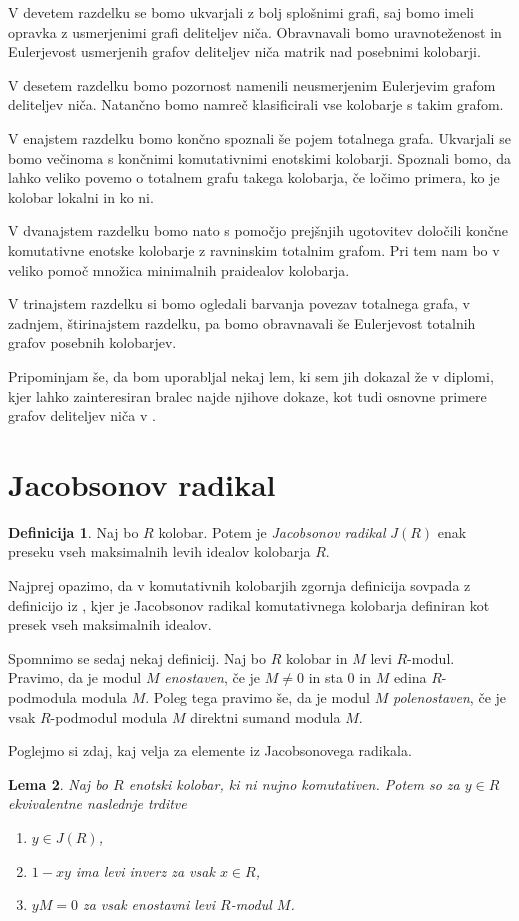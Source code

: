 \documentclass[a4paper, 12pt]{amsart}
\theoremstyle{definition} %
\newtheorem{definicija}{Definicija}[section]
\theoremstyle{plain} %
\newtheorem{lema}[definicija]{Lema}
\begin{document}
V devetem razdelku se bomo ukvarjali z bolj splošnimi grafi, saj bomo imeli opravka z usmerjenimi grafi deliteljev niča. Obravnavali bomo uravnoteženost in Eulerjevost usmerjenih grafov deliteljev niča matrik nad posebnimi kolobarji.

V desetem razdelku bomo pozornost namenili neusmerjenim Eulerjevim grafom deliteljev niča. Natančno bomo namreč klasificirali vse kolobarje s takim grafom.

V enajstem razdelku bomo končno spoznali še pojem totalnega grafa. Ukvarjali se bomo večinoma s končnimi komutativnimi enotskimi kolobarji. Spoznali bomo, da lahko veliko povemo o totalnem grafu takega kolobarja, če ločimo primera, ko je kolobar lokalni in ko ni.

V dvanajstem razdelku bomo nato s pomočjo prejšnjih ugotovitev določili končne komutativne enotske kolobarje z ravninskim totalnim grafom. Pri tem nam bo v veliko pomoč množica minimalnih praidealov kolobarja.

V trinajstem razdelku si bomo ogledali barvanja povezav totalnega grafa, v zadnjem, štirinajstem razdelku, pa bomo obravnavali še Eulerjevost totalnih grafov posebnih kolobarjev.

Pripominjam še, da bom uporabljal nekaj lem, ki sem jih dokazal že v diplomi, kjer lahko zainteresiran bralec najde njihove dokaze, kot tudi osnovne primere grafov deliteljev niča v \cite{diploma}.

\section{Jacobsonov radikal}

\begin{definicija} 
Naj bo $R$ kolobar. Potem je \emph{Jacobsonov radikal} $J(R)$ enak preseku vseh maksimalnih levih idealov kolobarja $R$.
\end{definicija}
Najprej opazimo, da v komutativnih kolobarjih zgornja definicija sovpada z definicijo iz \cite{diploma}, kjer je Jacobsonov radikal komutativnega kolobarja definiran kot presek vseh maksimalnih idealov.

Spomnimo se sedaj nekaj definicij. Naj bo $R$ kolobar in $M$ levi $R$-modul. Pravimo, da je modul $M$ \emph{enostaven}, če je $M\neq0$ in sta 0 in $M$ edina $R$-podmodula modula $M$.  Poleg tega pravimo še, da je modul $M$ \emph{polenostaven}, če je vsak $R$-podmodul modula $M$ direktni sumand modula $M$. 

Poglejmo si zdaj, kaj velja za elemente iz Jacobsonovega radikala.
\begin{lema}
\label{J(R)-prvic}
Naj bo $R$ enotski kolobar, ki ni nujno komutativen. Potem so za $y\in R$ ekvivalentne naslednje trditve
 \begin{enumerate}
 \item $y\in J(R)$,
\item $1-xy$ ima levi inverz za vsak $x\in R$,
\item $ yM = 0$ za vsak enostavni levi $R$-modul $M$.
\end{enumerate}
\end{lema}
\end{document}
